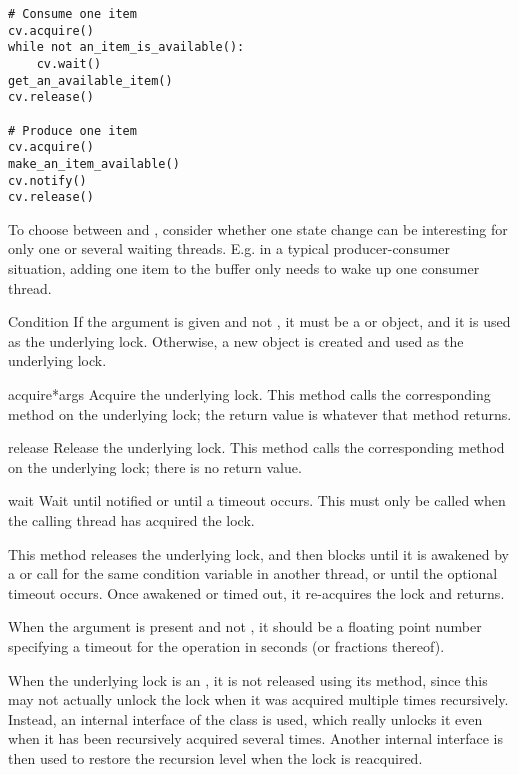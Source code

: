 \begin{verbatim}
# Consume one item
cv.acquire()
while not an_item_is_available():
    cv.wait()
get_an_available_item()
cv.release()

# Produce one item
cv.acquire()
make_an_item_available()
cv.notify()
cv.release()
\end{verbatim}

To choose between  and , consider
whether one state change can be interesting for only one or several
waiting threads.  E.g. in a typical producer-consumer situation,
adding one item to the buffer only needs to wake up one consumer
thread.

\begin{classdesc}{Condition}{}
If the  argument is given and not , it must be a
 or  object, and it is used as the underlying
lock.  Otherwise, a new  object is created and used as
the underlying lock.
\end{classdesc}

\begin{methoddesc}{acquire}{*args}
Acquire the underlying lock.
This method calls the corresponding method on the underlying
lock; the return value is whatever that method returns.
\end{methoddesc}

\begin{methoddesc}{release}{}
Release the underlying lock.
This method calls the corresponding method on the underlying
lock; there is no return value.
\end{methoddesc}

\begin{methoddesc}{wait}{}
Wait until notified or until a timeout occurs.
This must only be called when the calling thread has acquired the
lock.

This method releases the underlying lock, and then blocks until it is
awakened by a  or  call for the
same condition variable in another thread, or until the optional
timeout occurs.  Once awakened or timed out, it re-acquires the lock
and returns.

When the  argument is present and not , it
should be a floating point number specifying a timeout for the
operation in seconds (or fractions thereof).

When the underlying lock is an , it is not released using
its  method, since this may not actually unlock the
lock when it was acquired multiple times recursively.  Instead, an
internal interface of the  class is used, which really
unlocks it even when it has been recursively acquired several times.
Another internal interface is then used to restore the recursion level
when the lock is reacquired.
\end{methoddesc}

